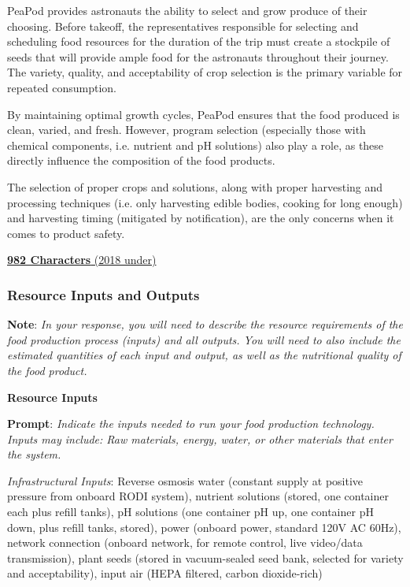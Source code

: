 \documentclass{../tex/report}
\begin{document}
PeaPod provides astronauts the ability to select and grow produce of their choosing. Before takeoff, the representatives responsible for selecting and scheduling food resources for the duration of the trip must create a stockpile of seeds that will provide ample food for the astronauts throughout their journey. The variety, quality, and acceptability of crop selection is the primary variable for repeated consumption.

By maintaining optimal growth cycles, PeaPod ensures that the food produced is clean, varied, and fresh. However, program selection (especially those with chemical components, i.e. nutrient and pH solutions) also play a role, as these directly influence the composition of the food products.

The selection of proper crops and solutions, along with proper harvesting and processing techniques (i.e. only harvesting edible bodies, cooking for long enough) and harvesting timing (mitigated by notification), are the only concerns when it comes to product safety.

\uline{\textbf{982 Characters} (2018 under)}


\newpage

\subsubsection{Resource Inputs and Outputs}
\label{sec:resource}

\textbf{Note}: \textit{In your response, you will need to describe the resource requirements of the food production process (inputs) and all outputs. You will need to also include the estimated quantities of each input and output, as well as the nutritional quality of the food product.}

\textbf{Resource Inputs}
\label{sec:resource-inputs}

\textbf{Prompt}: \textit{Indicate the inputs needed to run your food production technology. Inputs may include: Raw materials, energy, water, or other materials that enter the system.}


\textit{Infrastructural Inputs}: Reverse osmosis water (constant supply at positive pressure from onboard RODI system), nutrient solutions (stored, one container each plus refill tanks), pH solutions (one container pH up, one container pH down, plus refill tanks, stored), power (onboard power, standard 120V AC 60Hz), network connection (onboard network, for remote control, live video/data transmission), plant seeds (stored in vacuum-sealed seed bank, selected for variety and acceptability), input air (HEPA filtered, carbon dioxide-rich)
\end{document}
